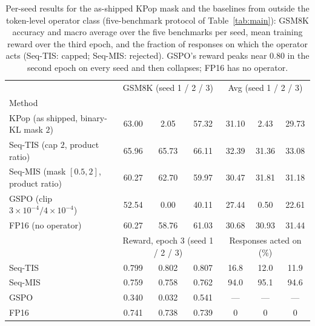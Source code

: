 \begin{table}[h]
\centering
\caption{Per-seed results for the as-shipped KPop mask and the baselines from outside the token-level operator class (five-benchmark protocol of Table~\ref{tab:main}): GSM8K accuracy and macro average over the five benchmarks per seed, mean training reward over the third epoch, and the fraction of responses on which the operator acts (Seq-TIS: capped; Seq-MIS: rejected). GSPO's reward peaks near $0.80$ in the second epoch on every seed and then collapses; FP16 has no operator.}
\label{tab:extra_seeds}
\footnotesize\setlength{\tabcolsep}{4pt}
\begin{tabular}{lcccccc}
\toprule
 & \multicolumn{3}{c}{GSM8K (seed 1 / 2 / 3)} & \multicolumn{3}{c}{Avg (seed 1 / 2 / 3)} \\
Method & & & & & & \\
\midrule
KPop (as shipped, binary-KL mask $2$) & 63.00 & 2.05 & 57.32 & 31.10 & 2.43 & 29.73 \\
Seq-TIS (cap $2$, product ratio) & 65.96 & 65.73 & 66.11 & 32.39 & 31.36 & 33.08 \\
Seq-MIS (mask $[0.5,2]$, product ratio) & 60.27 & 62.70 & 59.97 & 30.47 & 31.81 & 31.18 \\
GSPO (clip $3\times10^{-4}/4\times10^{-4}$) & 52.54 & 0.00 & 40.11 & 27.44 & 0.50 & 22.61 \\
FP16 (no operator) & 60.27 & 58.76 & 61.03 & 30.68 & 30.93 & 31.44 \\
\midrule
 & \multicolumn{3}{c}{Reward, epoch 3 (seed 1 / 2 / 3)} & \multicolumn{3}{c}{Responses acted on (\%)} \\
\midrule
Seq-TIS & 0.799 & 0.802 & 0.807 & 16.8 & 12.0 & 11.9 \\
Seq-MIS & 0.759 & 0.758 & 0.762 & 94.0 & 95.1 & 94.6 \\
GSPO & 0.340 & 0.032 & 0.541 & --- & --- & --- \\
FP16 & 0.741 & 0.738 & 0.739 & 0 & 0 & 0 \\
\bottomrule
\end{tabular}
\end{table}

